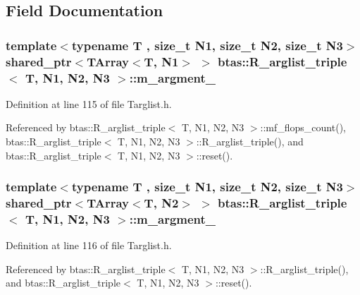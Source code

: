 \subsection{Field Documentation}
\subsubsection[{m\-\_\-argment\-\_\-1}]{\setlength{\rightskip}{0pt plus 5cm}template$<$typename T , size\-\_\-t N1, size\-\_\-t N2, size\-\_\-t N3$>$ shared\-\_\-ptr$<${\bf T\-Array}$<$T, N1$>$ $>$ {\bf btas\-::\-R\-\_\-arglist\-\_\-triple}$<$ T, N1, N2, N3 $>$\-::m\-\_\-argment\-\_\hspace{0.3cm}{\ttfamily [protected]}}\label{dd/d0a/classbtas_1_1R__arglist__triple_a0c1ef9115472c589a2f27bbc7a6976df}


Definition at line 115 of file Targlist.\-h.



Referenced by btas\-::\-R\-\_\-arglist\-\_\-triple$<$ T, N1, N2, N3 $>$\-::mf\-\_\-flops\-\_\-count(), btas\-::\-R\-\_\-arglist\-\_\-triple$<$ T, N1, N2, N3 $>$\-::\-R\-\_\-arglist\-\_\-triple(), and btas\-::\-R\-\_\-arglist\-\_\-triple$<$ T, N1, N2, N3 $>$\-::reset().

\subsubsection[{m\-\_\-argment\-\_\-2}]{\setlength{\rightskip}{0pt plus 5cm}template$<$typename T , size\-\_\-t N1, size\-\_\-t N2, size\-\_\-t N3$>$ shared\-\_\-ptr$<${\bf T\-Array}$<$T, N2$>$ $>$ {\bf btas\-::\-R\-\_\-arglist\-\_\-triple}$<$ T, N1, N2, N3 $>$\-::m\-\_\-argment\-\_\hspace{0.3cm}{\ttfamily [protected]}}\label{dd/d0a/classbtas_1_1R__arglist__triple_a0dfde03a15e13f6f5c492389078a49d7}


Definition at line 116 of file Targlist.\-h.



Referenced by btas\-::\-R\-\_\-arglist\-\_\-triple$<$ T, N1, N2, N3 $>$\-::\-R\-\_\-arglist\-\_\-triple(), and btas\-::\-R\-\_\-arglist\-\_\-triple$<$ T, N1, N2, N3 $>$\-::reset().

